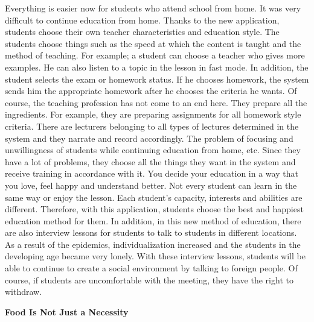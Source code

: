 \documentclass[]{book}
\begin{document}
Everything is easier now for students who attend school from home. It was very difficult to continue education from home. Thanks to the new application, students choose their own teacher characteristics and education style. The students choose things such as the speed at which the content is taught and the method of teaching. For example; a student can choose a teacher who gives more examples. He can also listen to a topic in the lesson in fast mode. In addition, the student selects the exam or homework status. If he chooses homework, the system sends him the appropriate homework after he chooses the criteria he wants. Of course, the teaching profession has not come to an end here. They prepare all the ingredients. For example, they are preparing assignments for all homework style criteria. There are lecturers belonging to all types of lectures determined in the system and they narrate and record accordingly. The problem of focusing and unwillingness of students while continuing education from home, etc. Since they have a lot of problems, they choose all the things they want in the system and receive training in accordance with it. You decide your education in a way that you love, feel happy and understand better. Not every student can learn in the same way or enjoy the lesson. Each student's capacity, interests and abilities are different. Therefore, with this application, students choose the best and happiest education method for them. In addition, in this new method of education, there are also interview lessons for students to talk to students in different locations. As a result of the epidemics, individualization increased and the students in the developing age became very lonely. With these interview lessons, students will be able to continue to create a social environment by talking to foreign people. Of course, if students are uncomfortable with the meeting, they have the right to withdraw.

\textbf{Food Is Not Just a Necessity}
\end{document}
